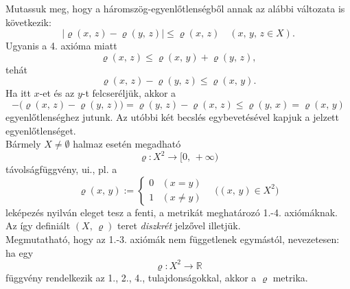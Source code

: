 \documentclass[12pt]{article}
\newcommand{\R}{\mathbb{R}}
\begin{document}
    Mutassuk meg, hogy a háromszög-egyenlőtlenségből annak az alábbi változata is következik:
    \[
        |\varrho(x, \, z) - \varrho(y, \, z)| \leq \varrho(x, \, z) \quad (x, \, y, \, z \in X).
    \]
    Ugyanis a 4. axióma miatt
    \[
        \varrho(x, \, z) \leq \varrho(x, \, y) + \varrho(y, \, z),
    \]
    tehát
    \[
        \varrho(x, \, z) - \varrho(y, \, z) \leq \varrho(x, \, y).
    \]
    Ha itt $x$-et és az $y$-t felcseréljük, akkor a
    \[
        -\big( \varrho(x, \, z) - \varrho(y, \, z) \big) = \varrho(y, \, z) - \varrho(x, \, z) \leq \varrho(y, \, x) = \varrho(x, \, y)
    \]
    egyenlőtlenséghez jutunk. Az utóbbi két becslés egybevetésével kapjuk a jelzett egyenlőtlenséget.\\

    Bármely $X \neq \emptyset$ halmaz esetén megadható
    \[
        \varrho : X^2 \to [0, \, +\infty)
    \]
    távolságfüggvény, ui., pl. a
    \[
        \varrho(x, \, y) :=
        \begin{cases}
        0 & (x = y) \\
        1 & (x \neq y)    
        \end{cases}
        \quad \big((x, \, y) \in X^2\big)
    \]
    leképezés nyilván eleget tesz a fenti, a metrikát meghatározó 1.-4. axiómáknak. Az így definiált $(X, \, \varrho)$ teret \textit{diszkrét} jelzővel illetjük.\\

    Megmutatható, hogy az 1.-3. axiómák nem függetlenek egymástól, nevezetesen: ha egy
    \[
        \varrho : X^2 \to \R
    \]
    függvény rendelkezik az 1., 2., 4., tulajdonságokkal, akkor a $\varrho$ metrika.\\
\end{document}
